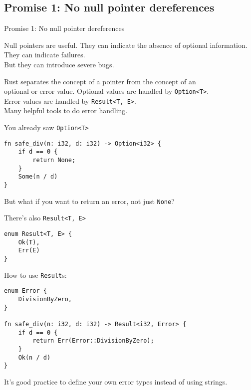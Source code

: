 \subsection{Promise 1: No null pointer dereferences}


\begin{frame}{Promise 1: No null pointer dereferences}

\begin{block}{Null pointers are useful.}
They can indicate the absence of optional information.\\
They can indicate failures.\\
But they can introduce severe bugs.
\end{block}
\vspace{1em}
\pause
\begin{block}{Rust separates the concept of a pointer from the concept of an\\
		optional or error value.}
	Optional values are handled by \texttt{Option<T>}.\\
  Error values are handled by \texttt{Result<T, E>}.\\
	Many helpful tools to do error handling.
\end{block}

\end{frame}


\begin{frame}[fragile]{You already saw \texttt{Option<T>}}
\begin{verbatim}
fn safe_div(n: i32, d: i32) -> Option<i32> {
    if d == 0 {
        return None;
    }
    Some(n / d)
}
\end{verbatim}
\pause
But what if you want to return an error, not just \texttt{None}?
\end{frame}


\begin{frame}[fragile]{There's also \texttt{Result<T, E>}}
\begin{verbatim}
enum Result<T, E> {
    Ok(T),
    Err(E)
}
\end{verbatim}
\end{frame}


\begin{frame}[fragile]{How to use \texttt{Result}s:}
\begin{verbatim}
enum Error {
    DivisionByZero,
}

fn safe_div(n: i32, d: i32) -> Result<i32, Error> {
    if d == 0 {
        return Err(Error::DivisionByZero);
    }
    Ok(n / d)
}
\end{verbatim}
\pause
It's good practice to define your own error types instead of using strings.
\end{frame}

